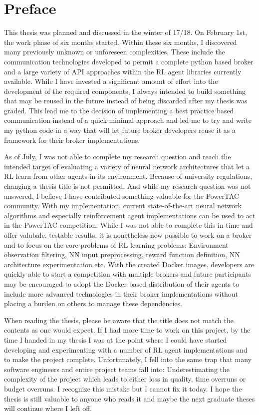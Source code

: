 \chapter{Preface}

This thesis was planned and discussed in the winter of 17/18. On February 1st, the work phase of six months started.
Within these six months, I discovered many previously unknown or unforeseen complexities. These include the
communication technologies developed to permit a complete python based broker and a large variety of API approaches
within the RL agent libraries currently available. While I have invested a significant amount of effort into the
development of the required components, I always intended to build something that may be reused in the future instead of
being discarded after my thesis was graded. This lead me to the decision of implementing a best practice based
communication instead of a quick minimal approach and led me to try and write my python code in a way that will let
future broker developers reuse it as a framework for their broker implementations. 

As of July, I was not able to complete my research question and reach the intended target of evaluating a variety of
neural network architectures that let a RL learn from other agents in its environment. Because of university
regulations, changing a thesis title is not permitted. And while my research question was not answered, I believe I have
contributed something valuable for the PowerTAC community. With my implementation, current state-of-the-art neural
network algorithms and especially reinforcement agent implementations can be used to act in the PowerTAC competition.
While I was not able to complete this in time and offer valubale, testable results, it is nonetheless now possible to
work on a broker and to focus on the core problems of RL learning problems: Environment observation filtering, NN input
preprocessing, reward function definition, NN architecture experimentation etc. With the created Docker images,
developers are quickly able to start a competition with multiple brokers and future participants may be encouraged to
adopt the Docker based distribution of their agents to include more advanced technologies in their broker
implementations without placing a burden on others to manage these dependencies.   

When reading the thesis, please be aware that the title does not match the contents as one would expect. If I had more
time to work on this project, by the time I handed in my thesis I was at the point where I could have started developing
and experimenting with a number of  RL agent implementations and to make the project complete. Unfortunately, I fell
into the same trap that many software engineers and entire project teams fall into: Underestimating the complexity of
the project which leads to either loss in quality, time overruns or budget overruns. I recognize this mistake but I
cannot fix it today. I hope the thesis is still valuable to anyone who reads it and maybe the next graduate theses will
continue where I left off. 
